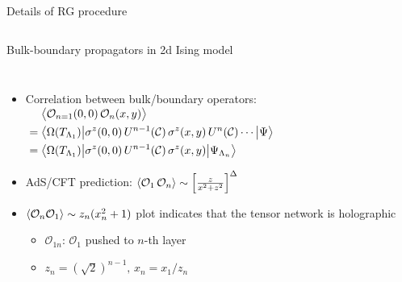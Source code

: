 \documentclass{fdubeamer}
\begin{document}
\begin{frame}{Details of RG procedure}
\begin{columns}[c]
\end{columns}


\end{frame}

\begin{frame}{Bulk-boundary propagators in 2d Ising model}

\begin{columns}[T]


    \begin{itemize}
      \item Correlation between bulk/boundary operators: \\[-2ex]
        \begingroup
          \small
          \mbox{\quad}
          $
            \begin{aligned}
              &\mathrel{\phantom{=}}
                 \ev[\big]{\mathcal{O}_{n=1}(0,0) \, \mathcal{O}_n(x,y)} \\
              &= \bigl\langle \Omega(T_{\Lambda_1}) \big|
                 \sigma^z(0,0) \, U^{n-1}(\mathcal{C}) \, \sigma^z(x,y) \, U^n(\mathcal{C}) \cdots
                 \big| \Psi \bigr\rangle \\
              &= \bigl\langle \Omega(T_{\Lambda_1}) \big|
                 \sigma^z(0,0) \, U^{n-1}(\mathcal{C}) \, \sigma^z(x,y)
                 \big| \Psi_{\Lambda_n} \bigr\rangle
            \end{aligned}
          $
        \endgroup
      \item AdS/CFT prediction: $\ev{\mathcal{O}_1 \, \mathcal{O}_n} \sim \left[ \frac{z}{x^2+z^2} \right]^\Delta$
      \item $\ev{\mathcal{O}_n\mathcal{O}_1} \sim z_n(x_n^2+1)$ plot indicates that the tensor network is holographic

        \begin{itemize}
          \item $\mathcal{O}_{1n}$: $\mathcal{O}_1$ pushed to $n$-th layer
          \item $z_n=(\sqrt{2})^{n-1}, \, x_n=x_1/z_n$
        \end{itemize}
    \end{itemize}



\end{columns}
\end{frame}
\end{document}
